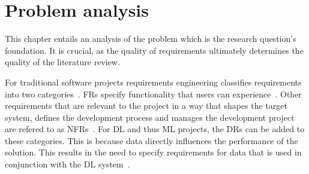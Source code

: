 \chapter{Problem analysis}\label{ch:problem} This chapter entails an analysis of the problem which is the research question's foundation.
It is crucial, as the quality of requirements ultimately determines the quality of the literature review.

For traditional software projects requirements engineering classifies requirements into
two categories~\cite{zowghi_requirements_2014}.
\Acp{FR} specify functionality that users can experience~\cite{noauthor_ieee_1998}.
Other requirements that are relevant to the project in a way that shapes the target system,
defines the development process and manages the development project are refered to as
\acp{NFR}~\cite{kotonya_requirements_1998,chung_non-functional_2009}.
For \ac{DL} and thus \ac{ML} projects, the \acp{DR} can be added
to these categories.
This is because data directly influences the performance of the solution.
This results in the need to specify requirements for data that is used
in conjunction with the \ac{DL} system~\cite{vogelsang_requirements_2019}.



